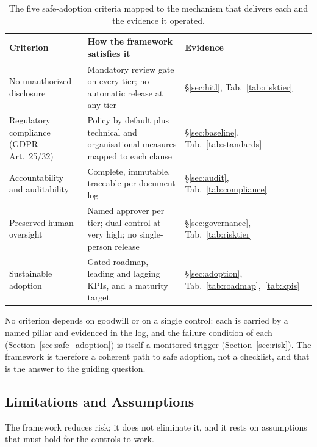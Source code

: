 \documentclass[12pt,a4paper]{article}
\begin{document}
\begin{table}[H]
\centering
\small
{}
\begin{tabular}{@{} p{3.4cm} p{7.2cm} p{3.2cm} @{}}
\toprule
\textbf{\color{accentdark}Criterion} & \textbf{\color{accentdark}How the framework satisfies it} & \textbf{\color{accentdark}Evidence} \\
\midrule
No unauthorized disclosure & Mandatory review gate on every tier; no automatic release at any tier & \S\ref{sec:hitl}, Tab.~\ref{tab:risktier} \\
Regulatory compliance (GDPR Art.~25/32) & Policy by default plus technical and organisational measures mapped to each clause & \S\ref{sec:baseline}, Tab.~\ref{tab:standards} \\
Accountability and auditability & Complete, immutable, traceable per-document log & \S\ref{sec:audit}, Tab.~\ref{tab:compliance} \\
Preserved human oversight & Named approver per tier; dual control at very high; no single-person release & \S\ref{sec:governance}, Tab.~\ref{tab:risktier} \\
Sustainable adoption & Gated roadmap, leading and lagging KPIs, and a maturity target & \S\ref{sec:adoption}, Tab.~\ref{tab:roadmap},~\ref{tab:kpis} \\
\bottomrule
\end{tabular}
\caption{The five safe-adoption criteria mapped to the mechanism that delivers each and the evidence it operated.}
\label{tab:answer}
\end{table}

No criterion depends on goodwill or on a single control: each is carried by a named pillar and evidenced in the log, and the failure condition of each (Section~\ref{sec:safe_adoption}) is itself a monitored trigger (Section~\ref{sec:risk}). The framework is therefore a coherent path to safe adoption, not a checklist, and that is the answer to the guiding question.

\subsection{Limitations and Assumptions}

The framework reduces risk; it does not eliminate it, and it rests on assumptions that must hold for the controls to work.
\end{document}
